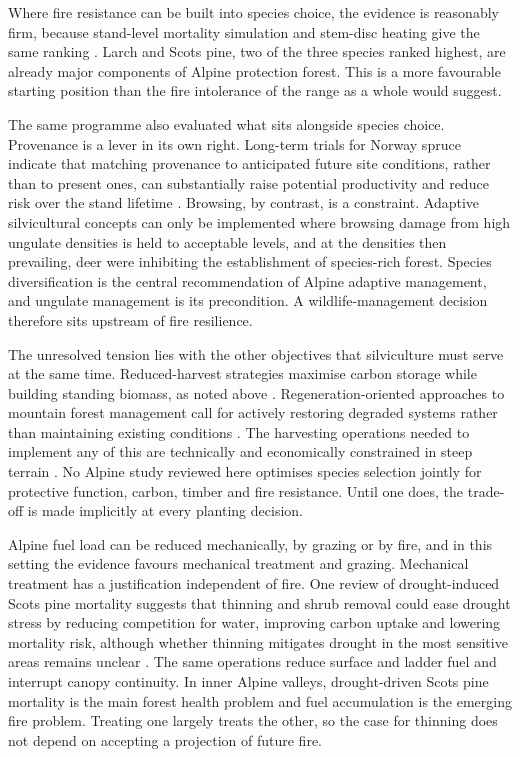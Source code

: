 \documentclass[11pt,a4paper]{article}
\begin{document}
Where fire resistance can be built into species choice, the evidence is reasonably firm, because stand-level mortality simulation and stem-disc heating give the same ranking \citep{dupire_vulnerability_2019, mutterer_bark_2026}. Larch and Scots pine, two of the three species ranked highest, are already major components of Alpine protection forest. This is a more favourable starting position than the fire intolerance of the range as a whole would suggest.

The same programme also evaluated what sits alongside species choice. Provenance is a lever in its own right. Long-term trials for Norway spruce indicate that matching provenance to anticipated future site conditions, rather than to present ones, can substantially raise potential productivity and reduce risk over the stand lifetime \citep{jandl_management_2013}. Browsing, by contrast, is a constraint. Adaptive silvicultural concepts can only be implemented where browsing damage from high ungulate densities is held to acceptable levels, and at the densities then prevailing, deer were inhibiting the establishment of species-rich forest. Species diversification is the central recommendation of Alpine adaptive management, and ungulate management is its precondition. A wildlife-management decision therefore sits upstream of fire resilience.

The unresolved tension lies with the other objectives that silviculture must serve at the same time. Reduced-harvest strategies maximise carbon storage while building standing biomass, as noted above \citep{jandl_strategies_2018}. Regeneration-oriented approaches to mountain forest management call for actively restoring degraded systems rather than maintaining existing conditions \citep{majlingova_sustainability_2025}. The harvesting operations needed to implement any of this are technically and economically constrained in steep terrain \citep{dinca_timber_2025}. No Alpine study reviewed here optimises species selection jointly for protective function, carbon, timber and fire resistance. Until one does, the trade-off is made implicitly at every planting decision.

Alpine fuel load can be reduced mechanically, by grazing or by fire, and in this setting the evidence favours mechanical treatment and grazing. Mechanical treatment has a justification independent of fire. One review of drought-induced Scots pine mortality suggests that thinning and shrub removal could ease drought stress by reducing competition for water, improving carbon uptake and lowering mortality risk, although whether thinning mitigates drought in the most sensitive areas remains unclear \citep{giuggiola_droughtinduced_2010}. The same operations reduce surface and ladder fuel and interrupt canopy continuity. In inner Alpine valleys, drought-driven Scots pine mortality is the main forest health problem and fuel accumulation is the emerging fire problem. Treating one largely treats the other, so the case for thinning does not depend on accepting a projection of future fire.
\end{document}
